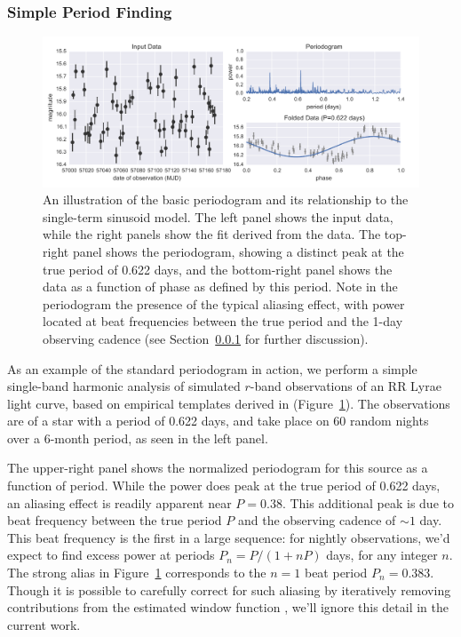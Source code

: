 \documentclass[12pt,preprint]{aastex}
\newcommand{\Fig}[1]{Figure~\ref{fig:#1}}
\newcommand{\fig}[1]{\Fig{#1}}
\newcommand{\figlabel}[1]{\label{fig:#1}}
\newcommand{\Sect}[1]{Section~\ref{sect:#1}}
\newcommand{\sect}[1]{\Sect{#1}}
\newcommand{\sectlabel}[1]{\label{sect:#1}}
\begin{document}
\subsubsection{Simple Period Finding}
\sectlabel{simple_period}

\begin{figure}
  \centering
  \includegraphics[width=\textwidth]{fig01.pdf}
  \caption{
    An illustration of the basic periodogram and its relationship to the single-term sinusoid model. The left panel shows the input data, while the right panels show the fit derived from the data. The top-right panel shows the periodogram, showing a distinct peak at the true period of 0.622 days, and the bottom-right panel shows the data as a function of phase as defined by this period. Note in the periodogram the presence of the typical aliasing effect, with power located at beat frequencies between the true period and the 1-day observing cadence (see \sect{simple_period} for further discussion).
  }
  \figlabel{basic_example}
\end{figure}

As an example of the standard periodogram in action, we perform a simple single-band harmonic analysis of simulated $r$-band observations of an RR Lyrae light curve, based on empirical templates derived in \citet{Sesar2010} (\fig{basic_example}). The observations are of a star with a period of 0.622 days, and take place on 60 random nights over a 6-month period, as seen in the left panel.

The upper-right panel shows the normalized periodogram for this source as a function of period. While the power does peak at the true period of 0.622 days, an aliasing effect is readily apparent near $P=0.38$. This additional peak is due to beat frequency between the true period $P$ and the observing cadence of $\sim 1$ day. This beat frequency is the first in a large sequence: for nightly observations, we'd expect to find excess power at periods $P_n = P / (1 + nP)$ days, for any integer $n$. The strong alias in \fig{basic_example} corresponds to the $n=1$ beat period $P_n=0.383$. Though it is possible to carefully correct for such aliasing by iteratively removing contributions from the estimated window function \citep[e.g.][]{Roberts87}, we'll ignore this detail in the current work.
\end{document}
